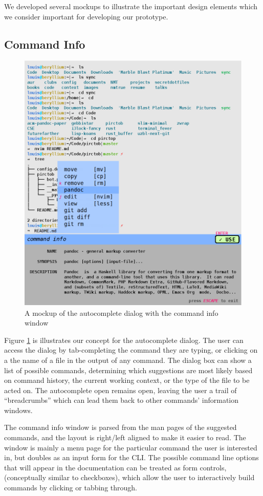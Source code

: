 We developed several mockups to illustrate the important design elements which
we consider important for developing our prototype.

\subsection{Command Info}

\begin{figure}[H]
  \centering
  \includegraphics[width=0.8\linewidth]{figures/interface/files.eps}
  \caption{A mockup of the autocomplete dialog with the command info window}
  \label{fig:cmdinfo}
\end{figure}

Figure \ref{fig:cmdinfo} is illustrates our concept for the autocomplete
dialog. The user can access the dialog by tab-completing the command they are
typing, or clicking on a the name of a file in the output of any command. The
dialog box can show a list of possible commands, determining which suggestions
are most likely based on command history, the current working context, or the
type of the file to be acted on. The autocomplete open remains open, leaving the
user a trail of ``breadcrumbs'' which can lead them back to other commands'
information windows.

The command info window is parsed from the man pages of the suggested commands,
and the layout is right/left aligned to make it easier to read. The window is
mainly a menu page for the particular command the user is interested in, but
doubles as an input form for the CLI. The possible command line options that
will appear in the documentation can be treated as form controls, (conceptually
similar to checkboxes), which allow the user to interactively build commands by
clicking or tabbing through.

